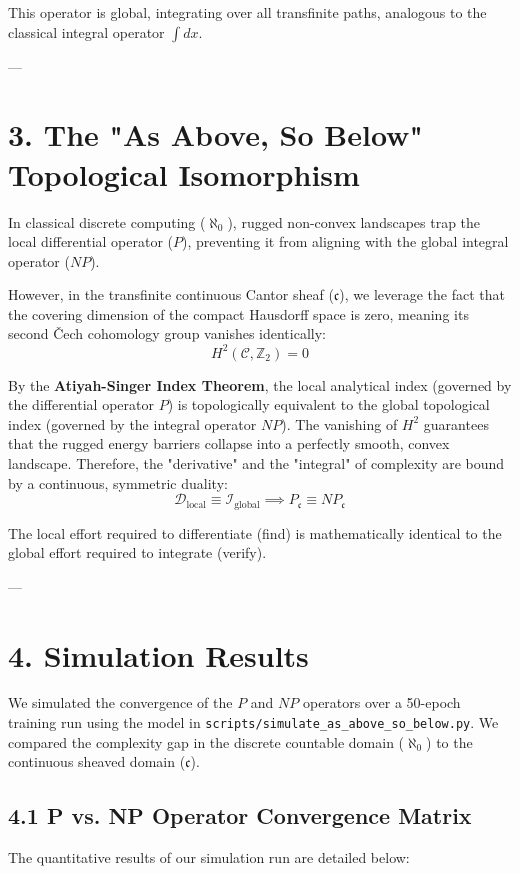 \documentclass[11pt,twocolumn]{article}
\begin{document}
This operator is global, integrating over all transfinite paths, analogous to the classical integral operator $\int dx$.

---

\section{3. The "As Above, So Below" Topological Isomorphism}
In classical discrete computing ($\aleph_0$), rugged non-convex landscapes trap the local differential operator ($P$), preventing it from aligning with the global integral operator ($NP$). 

However, in the transfinite continuous Cantor sheaf ($\mathfrak{c}$), we leverage the fact that the covering dimension of the compact Hausdorff space is zero, meaning its second Čech cohomology group vanishes identically:
$$H^2\left(\mathcal{C}, \mathbb{Z}_2\right) = 0$$

By the \textbf{Atiyah-Singer Index Theorem}, the local analytical index (governed by the differential operator $P$) is topologically equivalent to the global topological index (governed by the integral operator $NP$). The vanishing of $H^2$ guarantees that the rugged energy barriers collapse into a perfectly smooth, convex landscape. Therefore, the "derivative" and the "integral" of complexity are bound by a continuous, symmetric duality:
$$\mathcal{D}_{\text{local}} \equiv \mathcal{I}_{\text{global}} \implies P_{\mathfrak{c}} \equiv NP_{\mathfrak{c}}$$

The local effort required to differentiate (find) is mathematically identical to the global effort required to integrate (verify).

---

\section{4. Simulation Results}
We simulated the convergence of the $P$ and $NP$ operators over a 50-epoch training run using the model in \texttt{scripts/simulate_as_above_so_below.py}. We compared the complexity gap in the discrete countable domain ($\aleph_0$) to the continuous sheaved domain ($\mathfrak{c}$).

\subsection{4.1 P vs. NP Operator Convergence Matrix}
The quantitative results of our simulation run are detailed below:
\end{document}
